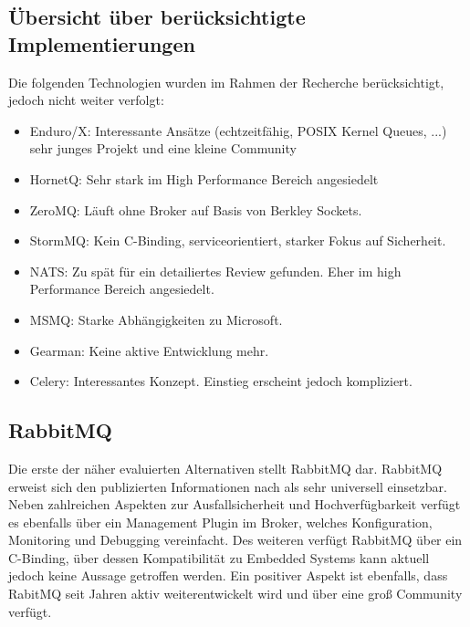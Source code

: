 \documentclass[conference, ngerman]{IEEEtran}
\begin{document}
\subsection{Übersicht über berücksichtigte Implementierungen}
Die folgenden Technologien wurden im Rahmen der Recherche berücksichtigt, jedoch nicht weiter verfolgt: 
\begin{itemize}
	\item Enduro/X: Interessante Ansätze (echtzeitfähig, POSIX Kernel Queues, ...) sehr junges Projekt und eine kleine Community
	\item HornetQ: Sehr stark im High Performance Bereich angesiedelt
	\item ZeroMQ: Läuft ohne Broker auf Basis von Berkley Sockets\cite{wiki:ZMQ}.
	\item StormMQ: Kein C-Binding, serviceorientiert, starker Fokus auf Sicherheit\cite{wiki:SMQ}. 
	\item NATS: Zu spät für ein detailiertes Review gefunden. Eher im high Performance Bereich angesiedelt\cite{DisMeQu}. 
	\item MSMQ: Starke Abhängigkeiten zu Microsoft\cite{wiki:MsMessQueu}.
	\item Gearman: Keine aktive Entwicklung mehr\cite{wiki:GEAR}. 
	\item Celery: Interessantes Konzept. Einstieg erscheint jedoch kompliziert\cite{wiki:CELERY}\cite{wiki:CWIKI}. 
\end{itemize}

\subsection{RabbitMQ}
Die erste der näher evaluierten Alternativen stellt RabbitMQ dar. RabbitMQ erweist sich den publizierten Informationen nach als sehr universell einsetzbar. Neben zahlreichen Aspekten zur Ausfallsicherheit und Hochverfügbarkeit verfügt es ebenfalls über ein Management Plugin im Broker, welches Konfiguration, Monitoring und Debugging vereinfacht\cite{WHATRMQ}. Des weiteren verfügt RabbitMQ über ein C-Binding, über dessen Kompatibilität zu Embedded Systems kann aktuell jedoch keine Aussage getroffen werden\cite{RMQEMB}\cite{RMQ_IOT}. Ein positiver Aspekt ist ebenfalls, dass RabitMQ seit Jahren aktiv weiterentwickelt wird und über eine groß Community verfügt. 
\end{document}
